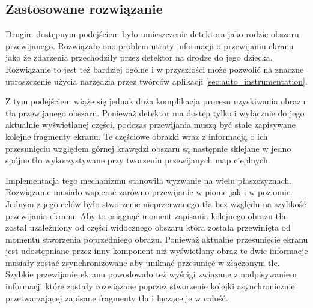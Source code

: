 \subsection{Zastosowane rozwiązanie}
Drugim dostępnym podejściem było umieszczenie detektora jako rodzic obszaru przewijanego. Rozwiązało ono problem utraty informacji o przewijaniu ekranu jako że zdarzenia przechodziły przez detektor na drodze do jego dziecka. Rozwiązanie to jest też bardziej ogólne i w przyszłości może pozwolić na znaczne uproszczenie użycia narzędzia przez twórców aplikacji \ref{sec:auto_instrumentation}. 

Z tym podejściem wiąże się jednak duża komplikacja procesu uzyskiwania obrazu tła przewijanego obszaru. Ponieważ detektor ma dostęp tylko i wyłącznie do jego aktualnie wyświetlanej części, podczas przewijania muszą być stale zapisywane kolejne fragmenty ekranu. Te częściowe obrazki wraz z informacją o ich przesunięciu względem górnej krawędzi obszaru są następnie sklejane w jedno spójne tło wykorzystywane przy tworzeniu przewijanych map cieplnych.

Implementacja tego mechanizmu stanowiła wyzwanie na wielu płaszczyznach. Rozwiązanie musiało wspierać zarówno przewijanie w pionie jak i w poziomie. Jednym z jego celów było stworzenie nieprzerwanego tła bez względu na szybkość przewijania ekranu. Aby to osiągnąć moment zapisania kolejnego obrazu tła został uzależniony od części widocznego obszaru która została przewinięta od momentu stworzenia poprzedniego obrazu. Ponieważ aktualne przesunięcie ekranu jest udostępniane przez inny komponent niż wyświetlany obraz te dwie informacje musiały zostać zsynchronizowane aby uniknąć przesunięć w złączonym tle. Szybkie przewijanie ekranu powodowało też wyścigi związane z nadpisywaniem informacji które zostały rozwiązane poprzez stworzenie kolejki asynchronicznie przetwarzającej zapisane fragmenty tła i łączące je w całość.
